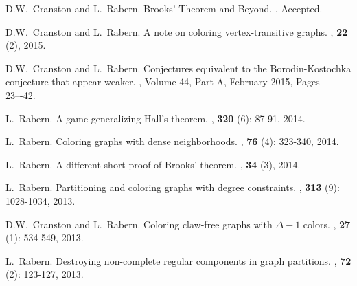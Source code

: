 \documentclass[margin,line]{res}
\begin{document}
\begin{resume}
\begin{enumerate}[{[}1{]}]
	\item
	D.W.~Cranston and L.~Rabern.
	\newblock Brooks' Theorem and Beyond.
	, Accepted.
	
	\smallskip
	
\item D.W.~Cranston and L.~Rabern.
\newblock A note on coloring vertex-transitive graphs.
, \textbf{22} (2), 2015.

\smallskip

\item
D.W.~Cranston and L.~Rabern.
\newblock Conjectures equivalent to the Borodin-Kostochka conjecture that appear weaker.
, Volume 44, Part A, February 2015, Pages 23–-42.

\smallskip

\item
L.~Rabern.
\newblock A game generalizing Hall's theorem.
, \textbf{320} (6): 87-91, 2014.

\smallskip

\item
L.~Rabern.
\newblock Coloring graphs with dense neighborhoods.
, \textbf{76} (4): 323-340, 2014.

\smallskip

\item
L.~Rabern.
\newblock A different short proof of Brooks' theorem.
,  \textbf{34} (3), 2014.

\smallskip

\item
L.~Rabern.
\newblock Partitioning and coloring graphs with degree constraints.
, \textbf{313} (9): 1028-1034, 2013.

\smallskip

\item
D.W.~Cranston and L.~Rabern.
\newblock Coloring claw-free graphs with $\Delta - 1$ colors.
, \textbf{27} (1): 534-549, 2013.

\smallskip

\item
L.~Rabern.
\newblock Destroying non-complete regular components in graph partitions.
, \textbf{72} (2): 123-127, 2013.


\end{enumerate}
\end{resume}
\end{document}
